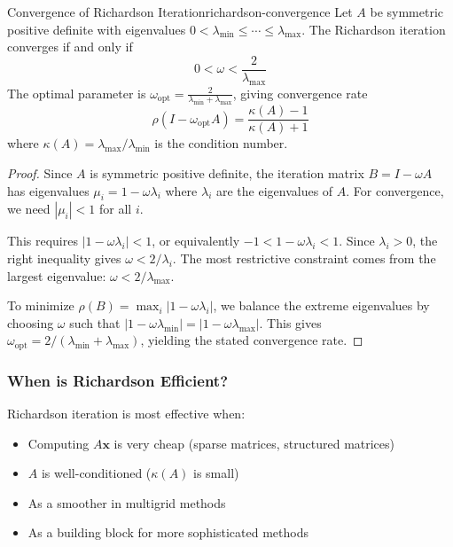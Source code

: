 \begin{theorem}{Convergence of Richardson Iteration}{richardson-convergence}
    Let $A$ be symmetric positive definite with eigenvalues $0 < \lambda_{\min} \leq \cdots \leq \lambda_{\max}$. The Richardson iteration converges if and only if
    \begin{equation}
        0 < \omega < \frac{2}{\lambda_{\max}}
    \end{equation}
    The optimal parameter is $\omega_{\text{opt}} = \frac{2}{\lambda_{\min} + \lambda_{\max}}$, giving convergence rate
    \begin{equation}
        \rho(I - \omega_{\text{opt}} A) = \frac{\kappa(A) - 1}{\kappa(A) + 1}
    \end{equation}
    where $\kappa(A) = \lambda_{\max}/\lambda_{\min}$ is the condition number.
\end{theorem}

\begin{proof}
    Since $A$ is symmetric positive definite, the iteration matrix $B = I - \omega A$ has eigenvalues $\mu_i = 1 - \omega \lambda_i$ where $\lambda_i$ are the eigenvalues of $A$. For convergence, we need $|\mu_i| < 1$ for all $i$.

    This requires $|1 - \omega \lambda_i| < 1$, or equivalently $-1 < 1 - \omega \lambda_i < 1$. Since $\lambda_i > 0$, the right inequality gives $\omega < 2/\lambda_i$. The most restrictive constraint comes from the largest eigenvalue: $\omega < 2/\lambda_{\max}$.

    To minimize $\rho(B) = \max_i |1 - \omega \lambda_i|$, we balance the extreme eigenvalues by choosing $\omega$ such that $|1 - \omega \lambda_{\min}| = |1 - \omega \lambda_{\max}|$. This gives $\omega_{\text{opt}} = 2/(\lambda_{\min} + \lambda_{\max})$, yielding the stated convergence rate.
\end{proof}

\subsubsection{When is Richardson Efficient?}

Richardson iteration is most effective when:
\begin{itemize}
    \item Computing $A\mathbf{x}$ is very cheap (sparse matrices, structured matrices)
    \item $A$ is well-conditioned ($\kappa(A)$ is small)
    \item As a smoother in multigrid methods
    \item As a building block for more sophisticated methods
\end{itemize}

